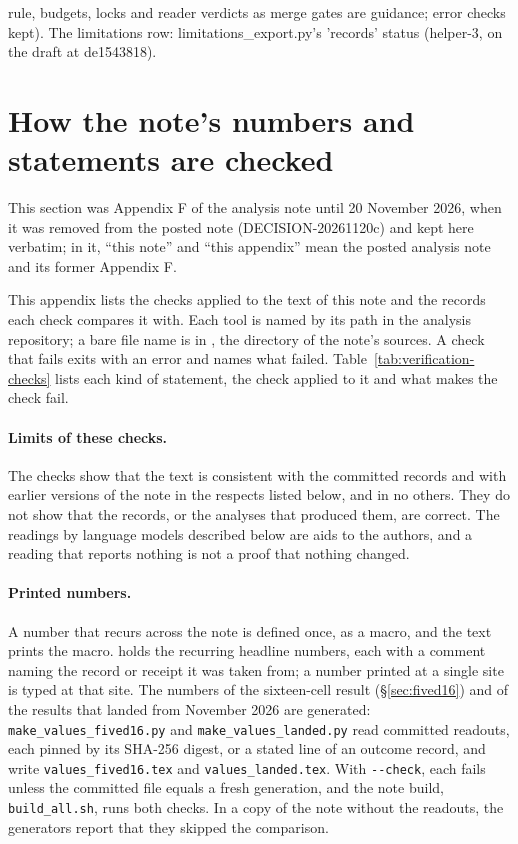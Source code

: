 rule, budgets, locks and reader verdicts as merge gates are guidance; error checks kept). The limitations row: limitations_export.py's 'records' status (helper-3, on the draft at de1543818).
\section{How the note's numbers and statements are checked}
\label{app:verification}

This section was Appendix F of the analysis note until 20 November 2026, when it was removed from the posted note (DECISION-20261120c) and kept here verbatim; in it, ``this note'' and ``this appendix'' mean the posted analysis note and its former Appendix F.

This appendix lists the checks applied to the text of this note and the records each check compares it with. Each tool is named by its path in the analysis repository; a bare file name is in , the directory of the note's sources. A check that fails exits with an error and names what failed. Table~\ref{tab:verification-checks} lists each kind of statement, the check applied to it and what makes the check fail.

\paragraph{Limits of these checks.} The checks show that the text is consistent with the committed records and with earlier versions of the note in the respects listed below, and in no others. They do not show that the records, or the analyses that produced them, are correct. The readings by language models described below are aids to the authors, and a reading that reports nothing is not a proof that nothing changed.

\paragraph{Printed numbers.} A number that recurs across the note is defined once, as a macro, and the text prints the macro.  holds the recurring headline numbers, each with a comment naming the record or receipt it was taken from; a number printed at a single site is typed at that site. The numbers of the sixteen-cell result (\S\ref{sec:fived16}) and of the results that landed from November 2026 are generated: \texttt{make\_values\_fived16.py} and \texttt{make\_values\_landed.py} read committed readouts, each pinned by its SHA-256 digest, or a stated line of an outcome record, and write \texttt{values\_fived16.tex} and \texttt{values\_landed.tex}. With \texttt{-{}-check}, each fails unless the committed file equals a fresh generation, and the note build, \texttt{build\_all.sh}, runs both checks. In a copy of the note without the readouts, the generators report that they skipped the comparison.

